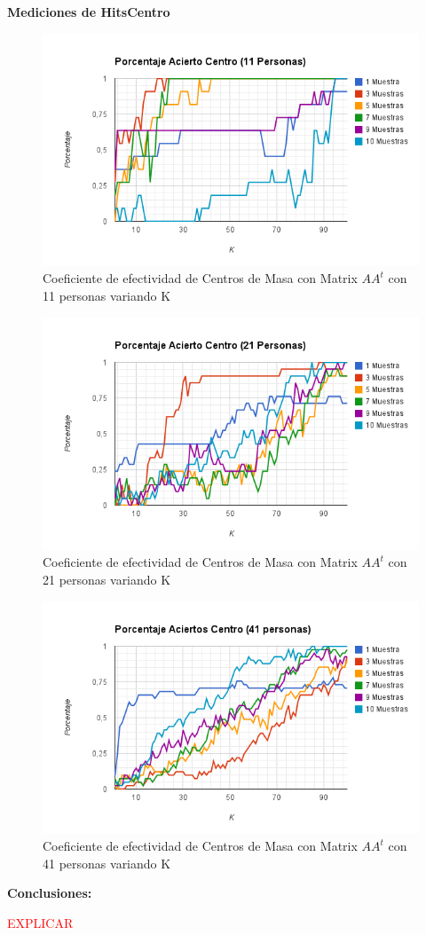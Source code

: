 \textbf{Mediciones de HitsCentro }

\begin{figure}[H]
\includegraphics[width=1\textwidth]{img/imagef13.png}
     \caption{Coeficiente de efectividad de Centros de Masa con Matrix $AA^t$ con 11 personas variando K}
\end{figure}

\begin{figure}[H]
\includegraphics[width=1\textwidth]{img/imagef14.png}
     \caption{Coeficiente de efectividad de Centros de Masa con Matrix $AA^t$ con 21 personas variando K}
\end{figure}

\begin{figure}[H]
\includegraphics[width=1\textwidth]{img/imagef15.png}
     \caption{Coeficiente de efectividad de Centros de Masa  con Matrix $AA^t$ con 41 personas variando K}
\end{figure}


\textbf{Conclusiones:}

\textcolor{red}{EXPLICAR}
